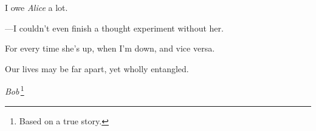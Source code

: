 \cleardoublepage
  \thispagestyle{empty}
  \begin{savenotes}
    \epigraph{
      I owe \emph{Alice} a lot.
      
      ---I couldn't even
      finish a thought experiment without her.

      For every time she's up,
      when I'm down,
      and vice versa.

      Our lives may be far apart, yet wholly entangled.
    }{
      \emph{Bob}\,\footnote{ Based on a true story. }
    }
  \end{savenotes}
\clearpage